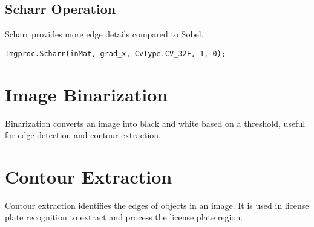 \documentclass{article}
\begin{document}
	\subsection{Scharr Operation}
	Scharr provides more edge details compared to Sobel.
	
	\texttt{Imgproc.Scharr(inMat, grad\_x, CvType.CV\_32F, 1, 0);}
	
	\section{Image Binarization}
	Binarization converts an image into black and white based on a threshold, useful for edge detection and contour extraction.
	
	\section{Contour Extraction}
	Contour extraction identifies the edges of objects in an image. It is used in license plate recognition to extract and process the license plate region.
	
\end{document}

